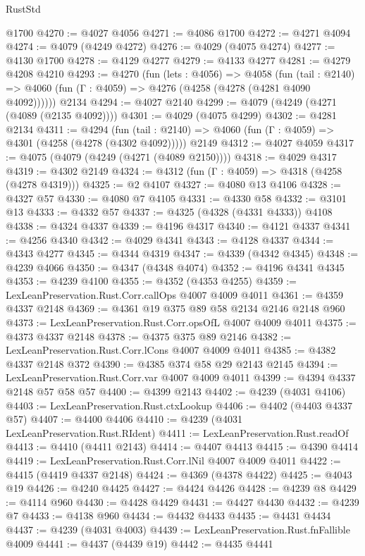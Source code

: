 \begin{lexlean}{RustStd}
\begin{coremodule}
    @1700
@4270 := @4027 @4056
@4271 := @4086 @1700
@4272 := @4271 @4094
@4274 := @4079 (@4249 @4272)
@4276 := @4029 (@4075 @4274)
@4277 := @4130 @1700
@4278 := @4129 @4277
@4279 := @4133 @4277
@4281 := @4279 @4208 @4210
@4293 := @4270
    (fun (lets : @4056) =>
    @4058
      (fun (tail : @2140) => @4060 (fun (Γ : @4059) => @4276 (@4258 (@4278 (@4281 @4090 @4092))))))
    @2134
@4294 := @4027 @2140
@4299 := @4079 (@4249 (@4271 (@4089 (@2135 @4092))))
@4301 := @4029 (@4075 @4299)
@4302 := @4281 @2134
@4311 := @4294
    (fun (tail : @2140) => @4060 (fun (Γ : @4059) => @4301 (@4258 (@4278 (@4302 @4092)))))
    @2149
@4312 := @4027 @4059
@4317 := @4075 (@4079 (@4249 (@4271 (@4089 @2150))))
@4318 := @4029 @4317
@4319 := @4302 @2149
@4324 := @4312 (fun (Γ : @4059) => @4318 (@4258 (@4278 @4319)))
@4325 := @2 @4107
@4327 := @4080 @13 @4106
@4328 := @4327 @57
@4330 := @4080 @7 @4105
@4331 := @4330 @58
@4332 := @3101 @13
@4333 := @4332 @57
@4337 := @4325 (@4328 (@4331 @4333)) @4108
@4338 := @4324 @4337
@4339 := @4196 @4317
@4340 := @4121 @4337
@4341 := @4256 @4340
@4342 := @4029 @4341
@4343 := @4128 @4337
@4344 := @4343 @4277
@4345 := @4344 @4319
@4347 := @4339 (@4342 @4345)
@4348 := @4239 @4066
@4350 := @4347 (@4348 @4074)
@4352 := @4196 @4341 @4345
@4353 := @4239 @4100
@4355 := @4352 (@4353 @4255)
@4359 := LexLeanPreservation.Rust.Corr.callOps @4007 @4009 @4011
@4361 := @4359 @4337 @2148
@4369 := @4361 @19 @375 @89 @58 @2134 @2146 @2148 @960
@4373 := LexLeanPreservation.Rust.Corr.opsOfL @4007 @4009 @4011
@4375 := @4373 @4337 @2148
@4378 := @4375 @375 @89 @2146
@4382 := LexLeanPreservation.Rust.Corr.lCons @4007 @4009 @4011
@4385 := @4382 @4337 @2148 @372
@4390 := @4385 @374 @58 @29 @2143 @2145
@4394 := LexLeanPreservation.Rust.Corr.var @4007 @4009 @4011
@4399 := @4394 @4337 @2148 @57 @58 @57
@4400 := @4399 @2143
@4402 := @4239 (@4031 @4106)
@4403 := LexLeanPreservation.Rust.ctxLookup
@4406 := @4402 (@4403 @4337 @57)
@4407 := @4400 @4406
@4410 := @4239 (@4031 LexLeanPreservation.Rust.RIdent)
@4411 := LexLeanPreservation.Rust.readOf
@4413 := @4410 (@4411 @2143)
@4414 := @4407 @4413
@4415 := @4390 @4414
@4419 := LexLeanPreservation.Rust.Corr.lNil @4007 @4009 @4011
@4422 := @4415 (@4419 @4337 @2148)
@4424 := @4369 (@4378 @4422)
@4425 := @4043 @19
@4426 := @4240 @4425
@4427 := @4424 @4426
@4428 := @4239 @8
@4429 := @4114 @960
@4430 := @4428 @4429
@4431 := @4427 @4430
@4432 := @4239 @7
@4433 := @4138 @960
@4434 := @4432 @4433
@4435 := @4431 @4434
@4437 := @4239 (@4031 @4003)
@4439 := LexLeanPreservation.Rust.fnFallible @4009
@4441 := @4437 (@4439 @19)
@4442 := @4435 @4441

\end{coremodule}
\end{lexlean}
